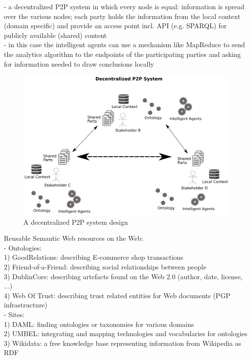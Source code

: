 - a decentralized P2P system in which every node is equal: information is spread over the various nodes; each party holds the information
from the local context (domain specific) and provide an access point incl. API (e.g. SPARQL) for publicly available (shared) content \\
- in this case the intelligent agents can use a mechanism like MapReduce to send the analytics algorithm to the endpoints of the participating parties
and asking for information needed to draw conclusions locally \\

\begin{figure}[H]
	\centering
		\includegraphics[width=0.8\columnwidth]{images/system_P2P_decentralized.pdf}
	\caption{A decentralized P2P system design}
\label{fig:images_system_P2P_decentralized}
\end{figure}

Reusable Semantic Web resources on the Web: \\
- Ontologies: \\
	1) GoodRelations: describing E-commerce shop transactions \\
	2) Friend-of-a-Friend: describing social relationships between people \\
	3) DublinCore: describing artefacts found on the Web 2.0 (author, date, license, ...) \\
	4) Web Of Trust: describing trust related entities for Web documents (PGP infrastructure) \\
- Sites: \\
  1) DAML: finding ontologies or taxonomies for various domains \\
	2) UMBEL: integrating and mapping technologies and vocabularies for ontologies \\
	3) Wikidata: a free knowledge base representing information from Wikipedia as RDF \\
\\
